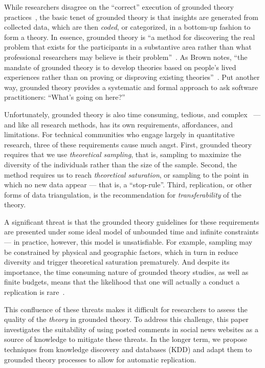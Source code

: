 \documentclass{sig-alternate}
\begin{document}
While researchers disagree on the ``correct'' execution of grounded theory practices~\cite{Suddaby2006}, the basic tenet of grounded theory is that insights are generated from collected data, which are then \textit{coded}, or categorized, in a bottom-up fashion to form a theory. In essence, grounded theory is ``a method for discovering the real problem that exists for the participants in a substantive area rather than what professional researchers may believe is their problem''~\cite{Adolph2008}. As Brown notes, ``the mandate of grounded theory is to develop theories based on people's lived experiences rather than on proving or disproving existing theories''~\cite{brown2012daring}. Put another way, grounded theory provides a systematic and formal approach to ask software practitioners: ``What's going on here?''

Unfortunately, grounded theory is also time consuming, tedious, and complex~\cite{Olson2014} --- and like all research methods, has its own requirements, affordances, and limitations. For technical communities who engage largely in quantitative research, three of these requirements cause much angst. First, grounded theory requires that we use \textit{theoretical sampling}, that is, sampling to maximize the diversity of the individuals rather than the size of the sample. Second, the method requires us to reach \textit{theoretical saturation}, or sampling to the point in which no new data appear --- that is, a ``stop-rule''. Third, replication, or other forms of data triangulation, is the recommendation for \textit{transferability} of the theory.

A significant threat is that the grounded theory guidelines for these requirements are presented under some ideal model of unbounded time and infinite constraints --- in practice, however, this model is unsatisfiable. For example, sampling may be constrained by physical and geographic factors, which in turn in reduce diversity and trigger theoretical saturation prematurely. And despite its importance, the time consuming nature of grounded theory studies, as well as finite budgets, means that the likelihood that one will actually a conduct a replication is rare~\cite{Shull2008b}.

This confluence of these threats makes it difficult for researchers to assess the quality of the \textit{theory} in grounded theory. To address this challenge, this paper investigates the suitability of using posted comments in social news websites as a source of knowledge to mitigate these threats. In the longer term, we propose techniques from knowledge discovery and databases (KDD) and adapt them to grounded theory processes to allow for automatic replication.
\end{document}
